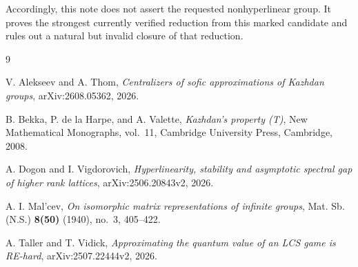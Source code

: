 \documentclass[11pt]{article}
\theoremstyle{definition}
\theoremstyle{remark}
\begin{document}
Accordingly, this note does not assert the requested nonhyperlinear group.
It proves the strongest currently verified reduction from this marked
candidate and rules out a natural but invalid closure of that reduction.

\clearpage
\begin{thebibliography}{9}

V. Alekseev and A. Thom,
\emph{Centralizers of sofic approximations of Kazhdan groups},
arXiv:2608.05362, 2026.

B. Bekka, P. de la Harpe, and A. Valette,
\emph{Kazhdan's property (T)},
New Mathematical Monographs, vol.~11,
Cambridge University Press, Cambridge, 2008.

A. Dogon and I. Vigdorovich,
\emph{Hyperlinearity, stability and asymptotic spectral gap of higher rank
lattices},
arXiv:2506.20843v2, 2026.

A. I. Mal'cev,
\emph{On isomorphic matrix representations of infinite groups},
Mat. Sb. (N.S.) \textbf{8(50)} (1940), no.~3, 405--422.

A. Taller and T. Vidick,
\emph{Approximating the quantum value of an LCS game is RE-hard},
arXiv:2507.22444v2, 2026.

\end{thebibliography}
\end{document}
